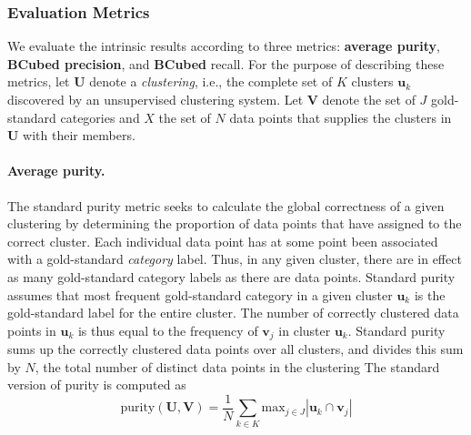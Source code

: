 \subsubsection{Evaluation Metrics} 
\label{sec:metrics}
We evaluate the intrinsic results according to three metrics: \textbf{average purity}, \textbf{BCubed precision}, and
 \textbf{BCubed} recall. For the purpose of describing these metrics,
 let $\mathbf{U}$ denote a \emph{clustering}, i.e., the complete set of $K$ clusters $\mathbf{u}_k$
 discovered by an unsupervised clustering system. Let
 $\mathbf{V}$ denote the set of $J$ gold-standard categories and $X$ the set of $N$ data points 
 that supplies the clusters in $\mathbf{U}$ with their members. 
% 
\paragraph{Average purity.}
The standard purity metric seeks to calculate the global correctness of a 
given clustering by determining the proportion of data points that have 
assigned to the correct cluster. Each individual data point has at some 
point been associated with a gold-standard \emph{category} label. Thus, 
in any given cluster, there are in effect as many gold-standard category 
labels as there are data points. Standard purity assumes that most frequent 
 gold-standard category in a given cluster $\mathbf{u}_k$ is the gold-standard label for the entire cluster. The number of correctly clustered data points in $\mathbf{u}_k$ is thus equal to the frequency of  $\mathbf{v}_j$ in cluster $\mathbf{u}_k$. Standard purity sums up the correctly clustered data points over all clusters, and divides this sum by $N$, the total number of distinct data points in the clustering
 The standard version of purity is computed as 
\begin{equation} \label{eq:pur1}
\text{purity}(\mathbf{U}, \mathbf{V}) = \frac{1}{N} \sum_{k \in K} \text{max}_{j \in J} |\mathbf{u}_k \cap \mathbf{v}_j|
\end{equation}
